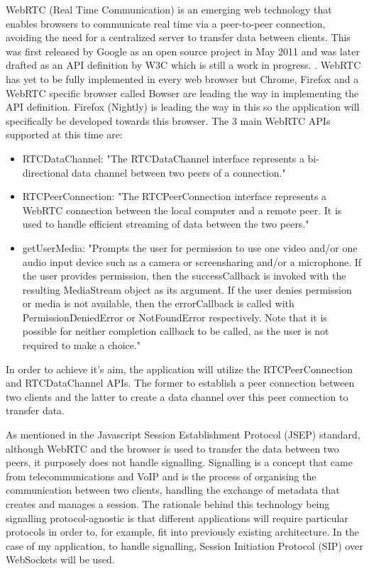 \documentclass[]{report}
\begin{document}
			WebRTC (Real Time Communication) is an emerging web technology that enables browsers to communicate real time via a peer-to-peer connection, avoiding the need for a centralized server to transfer data between clients. This was first released by Google as an open source project in May 2011 \cite{Google WebRTC Release} and was later drafted as an API definition by W3C which is still a work in progress. \cite{W3C WebRTC Definition}. WebRTC has yet to be fully implemented in every web browser but Chrome, Firefox and a WebRTC specific browser called Bowser are leading the way in implementing the API definition. Firefox (Nightly) is leading the way in this so the application will specifically be developed towards this browser\cite{WebRTC browser support}.
			The 3 main WebRTC APIs supported at this time are:
				\begin{itemize}
					\item RTCDataChannel:
					"The RTCDataChannel interface represents a bi-directional data channel between two peers of a connection." \cite{Mozilla Web API}
					\item RTCPeerConnection:
					"The RTCPeerConnection interface represents a WebRTC connection between the local computer and a remote peer. It is used to handle efficient streaming of data between the two peers." 
					\cite{Mozilla Web API}
					\item getUserMedia:
					"Prompts the user for permission to use one video and/or one audio input device such as a camera or screensharing and/or a microphone. If the user provides permission, then the successCallback is invoked with the resulting MediaStream object as its argument. If the user denies permission or media is not available, then the errorCallback is called with PermissionDeniedError or NotFoundError respectively. Note that it is possible for neither completion callback to be called, as the user is not required to make a choice."
					\cite{Mozilla Web API}
				\end{itemize}

			In order to achieve it's aim, the application will utilize the RTCPeerConnection and RTCDataChannel APIs. The former to establish a peer connection between two clients and the latter to create a data channel over this peer connection to transfer data.
					
			As mentioned in the Javascript Session Establishment Protocol (JSEP) standard\cite{JSEP}, although WebRTC and the browser is used to transfer the data between two peers, it purposely does not handle signalling. Signalling is a concept that came from telecommunications and VoIP and is the process of organising the communication between two clients, handling the exchange of metadata that creates and manages a session. The rationale behind this technology being signalling protocol-agnostic is that different applications will require particular protocols in order to, for example, fit into previously existing architecture. In the case of my application, to handle signalling, Session Initiation Protocol (SIP) over WebSockets will be used.
			
\end{document}
